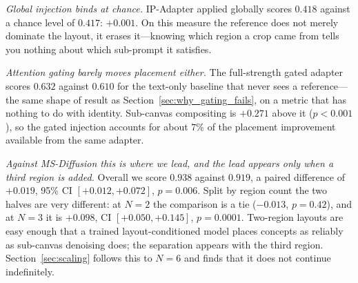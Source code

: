 \documentclass[10pt,twocolumn,letterpaper]{article}
\begin{document}
\begin{table}[htbp]
\centering
\caption{%
  \textbf{Region-level text-binding accuracy.}  Fraction of regions whose crop
  matches its own sub-prompt better than any sibling sub-prompt.  Chance is
  $1/N$: $0.50$ at $N{=}2$, $0.33$ at $N{=}3$.  ``$-$chance'' subtracts the
  per-sample chance level.  Significance is against Ours, paired over the same
  150 samples.%
}
\label{tab:binding}
\end{table}

\noindent\textit{Global injection binds at chance.}
IP-Adapter applied globally scores $0.418$ against a chance level of $0.417$:
$+0.001$.  On this measure the reference does not merely dominate the
layout, it erases it---knowing which region a crop came from tells you
nothing about which sub-prompt it satisfies.

\noindent\textit{Attention gating barely moves placement either.}
The full-strength gated adapter scores $0.632$ against $0.610$ for the
text-only baseline that never sees a reference---the same shape of result
as Section~\ref{sec:why_gating_fails}, on a metric that has nothing to do
with identity.  Sub-canvas compositing is $+0.271$ above it
($p{<}0.001$), so the gated injection accounts for about $7\%$ of the
placement improvement available from the same adapter.

\noindent\textit{Against MS-Diffusion this is where we lead, and the lead
appears only when a third region is added.}
Overall we score $0.938$ against $0.919$, a paired difference of $+0.019$,
95\% CI $[+0.012,+0.072]$, $p{=}0.006$.  Split by region count the two halves
are very different: at $N{=}2$ the comparison is a tie ($-0.013$, $p{=}0.42$),
and at $N{=}3$ it is $+0.098$, CI $[+0.050,+0.145]$, $p{=}0.0001$.
Two-region layouts are easy enough that a trained layout-conditioned model
places concepts as reliably as sub-canvas denoising does; the separation
appears with the third region.  Section~\ref{sec:scaling} follows this to
$N{=}6$ and finds that it does not continue indefinitely.
\end{document}
